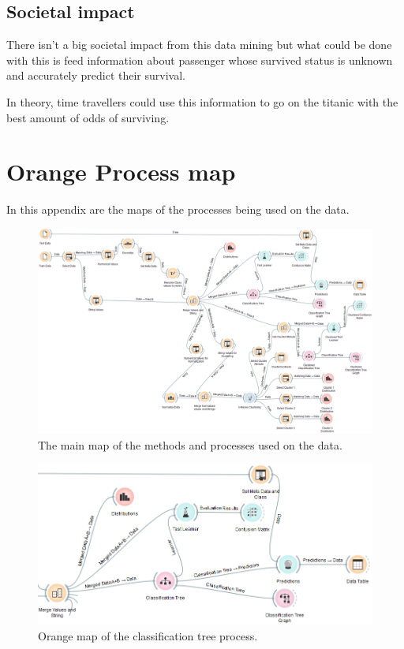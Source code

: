 \documentclass[a4paper,11pt]{article}
\begin{document}
\subsection{Societal impact}
There isn't a big societal impact from this data mining but what could be done with this is feed information about passenger whose survived status is unknown and accurately predict their survival.

In theory, time travellers could use this information to go on the titanic with the best amount of odds of surviving.


\clearpage
\appendix
\section{Orange Process map}
\label{appenOrange}
In this appendix are the maps of the processes being used on the data.
\begin{figure}[h]
	\centering
	\includegraphics[scale=0.35]{orangeMap}
	\caption{The main map of the methods and processes used on the data.}
	\label{OrangeMap}
\end{figure}


\begin{figure}[h]
\begin{center}
\includegraphics[scale=0.5]{ClassificationTreeOrange}
\end{center}
\caption{Orange map of the classification tree process.}
\label{classTreeMap}
\end{figure}
\end{document}
